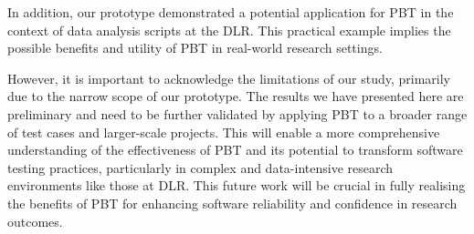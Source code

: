 \documentclass[runningheads]{llncs}
\begin{document}
In addition, our prototype demonstrated a potential application for PBT in the context of data analysis scripts at the DLR. This practical example implies the possible benefits and utility of PBT in real-world research settings.

However, it is important to acknowledge the limitations of our study, primarily due to the narrow scope of our prototype. The results we have presented here are preliminary and need to be further validated by applying PBT to a broader range of test cases and larger-scale projects. This will enable a more comprehensive understanding of the effectiveness of PBT and its potential to transform software testing practices, particularly in complex and data-intensive research environments like those at DLR. This future work will be crucial in fully realising the benefits of PBT for enhancing software reliability and confidence in research outcomes.

%
%
%


\end{document}
